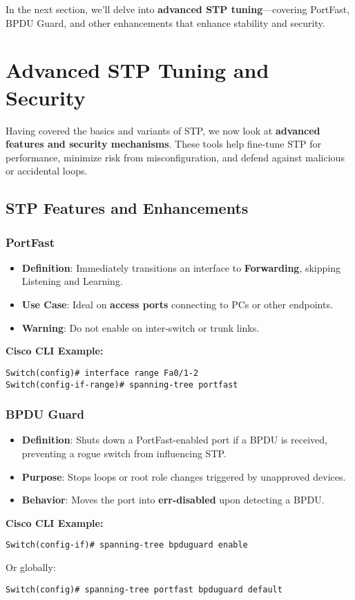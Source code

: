 \documentclass[a4paper]{report}
\begin{document}
In the next section, we’ll delve into \textbf{advanced STP tuning}---covering PortFast, BPDU Guard, and other enhancements that enhance stability and security.




\chapter{Advanced STP Tuning and Security}

Having covered the basics and variants of STP, we now look at \textbf{advanced features and security mechanisms}. These tools help fine-tune STP for performance, minimize risk from misconfiguration, and defend against malicious or accidental loops.

\section{STP Features and Enhancements}

\subsection{PortFast}
\begin{itemize}
    \item \textbf{Definition}: Immediately transitions an interface to \textbf{Forwarding}, skipping Listening and Learning.
    \item \textbf{Use Case}: Ideal on \textbf{access ports} connecting to PCs or other endpoints.
    \item \textbf{Warning}: Do not enable on inter-switch or trunk links.
\end{itemize}
\textbf{Cisco CLI Example:}
\begin{lstlisting}
Switch(config)# interface range Fa0/1-2
Switch(config-if-range)# spanning-tree portfast
\end{lstlisting}

\subsection{BPDU Guard}
\begin{itemize}
    \item \textbf{Definition}: Shuts down a PortFast-enabled port if a BPDU is received, preventing a rogue switch from influencing STP.
    \item \textbf{Purpose}: Stops loops or root role changes triggered by unapproved devices.
    \item \textbf{Behavior}: Moves the port into \textbf{err-disabled} upon detecting a BPDU.
\end{itemize}
\textbf{Cisco CLI Example:}
\begin{lstlisting}
Switch(config-if)# spanning-tree bpduguard enable
\end{lstlisting}
Or globally:
\begin{lstlisting}
Switch(config)# spanning-tree portfast bpduguard default
\end{lstlisting}
\end{document}
